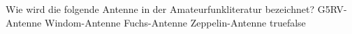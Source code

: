     {Wie wird die folgende Antenne in der Amateurfunkliteratur bezeichnet?  }
    {G5RV-Antenne}
    {Windom-Antenne}
    {Fuchs-Antenne}
    {Zeppelin-Antenne}
    {true}{false}